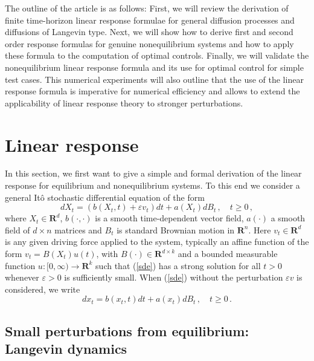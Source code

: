 \documentclass[]{tMPH2e}
\newcommand{\R}{{\mathbf R}}
\newcommand{\eps}{\varepsilon}
\begin{document}
The outline of the article is as follows: First, we will review the derivation of finite time-horizon linear response formulae for general diffusion processes and diffusions of Langevin type. Next, we will show how to derive first and second order response formulas for genuine nonequilibrium systems and how to apply these formula to the computation of optimal controls. Finally, we will validate the nonequilibrium linear response formula and its use for optimal control for simple test cases. This numerical experiments will also outline that the use of the linear response formula is imperative for numerical efficiency and allows to extend the applicability of linear response theory to stronger perturbations. 


 

\section{Linear response}


In this section, we first want to give a simple and formal derivation of the linear response for equilibrium and nonequilibrium systems. To this end we consider a general It\^o stochastic differential equation of the form
\begin{equation}\label{sde}
dX_{t} = (b(X_{t},t) + \eps v_{t})dt +a(X_{t})dB_{t}\,,\quad t\ge 0\,,
\end{equation}
where $X_{t}\in\R^{d}$, $b(\cdot,\cdot)$ is a smooth time-dependent vector field, $a(\cdot)$ a smooth field of $d\times n$ matrices and $B_{t}$ is standard Brownian motion in $\R^{n}$. Here $v_{t}\in\R^{d}$ is any given driving force applied to the system, typically an affine function of the form $v_{t}=B(X_{t})u(t)$, with $B(\cdot)\in\R^{d\times k}$ and a bounded measurable function $u\colon[0,\infty)\to\R^{k}$ such that (\ref{sde}) has a strong solution for all $t> 0$ whenever $\eps>0$ is sufficiently small. When (\ref{sde}) without the perturbation $\eps v$ is considered, we write
\begin{equation}\label{sdewo}
dx_{t} = b(x_{t},t)dt +a(x_{t})dB_{t}\,,\quad t\ge 0\,. 
\end{equation}


  




\subsection{Small perturbations from equilibrium: Langevin dynamics}
\end{document}
